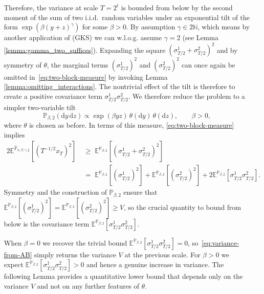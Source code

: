 \documentclass[reqno,11pt]{amsart}
\newcommand{\1}{\mathds{1}}
\theoremstyle{plain}
\theoremstyle{definition}
\numberwithin{equation}{section}
\newcommand{\bbE}{{\mathbb E}}
\newcommand{\bbN}{{\mathbb N}}
\newcommand{\bbP}{{\mathbb P}}
\newcommand{\de}{{\mathrm{d}}}
\def\lt{\left}
\def\rt{\right}
\begin{document}
Therefore, the variance at scale \(T = 2^t\) is bounded
from below by the second moment of the sum of two i.i.d.\ random variables
under an exponential tilt of the form \(\exp(\beta (y+z)^\gamma)\) for some
\(\beta > 0\). By assumption $\gamma \in 2\bbN$, which means by another application of (GKS) we can w.l.o.g. assume $\gamma=2$ (see Lemma \ref{lemma:gamma_two_suffices}).
Expanding the square $(\sigma^1 _{T/2}+\sigma^2 _{T/2})^2$ and by symmetry of
\(\theta\), the marginal terms \((\sigma^1 _{T/2})^2\) and \((\sigma^2 _{T/2})^2\) can once again be omitted in~\eqref{eq:two-block-measure} by invoking Lemma \ref{lemma:omitting_interactions}. The nontrivial
effect of the tilt is therefore to create a positive covariance term \(\sigma^1 _{T/2}\sigma^2 _{T/2}\).
We therefore reduce the problem to
a simpler two-variable tilt
\begin{equation}
    \label{eq:AB-tilt-def}
    \bbP_{\beta,2}(\de y\,\de z)
    \propto
    \exp(\beta yz)\,\theta(\de y)\,\theta(\de z),
    \qquad \beta > 0,
\end{equation}
where \(\theta\) is chosen as before.
In terms of this measure,
\eqref{eq:two-block-measure} implies
\begin{equation}
    \label{eq:variance-from-AB}
    \begin{split}
        2 \bbE^{\hat{\bbP}_{\alpha,T,\gamma,\xi}}\lt[ \lt( T^{-1/2} x_T  \rt)^2 \rt]
    \;&\ge\;
    \bbE^{\bbP_{\beta,2}}[(\sigma^1 _{T/2}+\sigma^2 _{T/2})^2] \\
    \;&=\; \bbE^{\bbP_{\beta,2}}[(\sigma^1 _{T/2})^2] + \bbE^{\bbP_{\beta,2}}[(\sigma^2 _{T/2})^2] + 2\bbE^{\bbP_{\beta,2}}[\sigma^1 _{T/2}\sigma^2 _{T/2}].
    \end{split}
\end{equation}
Symmetry and the construction of \(\bbP_{\beta,2}\) ensure that
\(\bbE^{\bbP_{\beta,2}}[(\sigma^1 _{T/2})^2] = \bbE^{\bbP_{\beta,2}}[(\sigma^2 _{T/2})^2] \ge V\), so the crucial quantity
to bound from below is the covariance term \(\bbE^{\bbP_{\beta,2}}[\sigma^1 _{T/2}\sigma^2 _{T/2}]\).

When \(\beta = 0\) we recover the trivial bound
\(\bbE^{\bbP_{\beta,2}}[\sigma^1 _{T/2}\sigma^2 _{T/2}] = 0\), so~\eqref{eq:variance-from-AB} simply returns the
variance \(V\) at the previous scale.
For \(\beta > 0\) we expect \(\bbE^{\bbP_{\beta,2}}[\sigma^1 _{T/2}\sigma^2 _{T/2}] > 0\) and hence
a genuine increase in variance.
The following Lemma provides a quantitative lower bound that depends only on
the variance \(V\) and not on any further features of \(\theta\).
\end{document}
